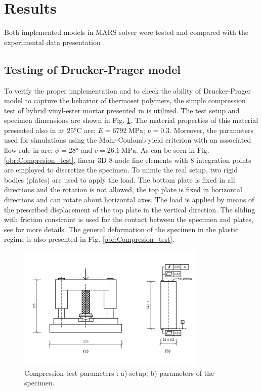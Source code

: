 \thispagestyle{plain}
\section{Results}
\indent

Both implemented models in MARS solver \cite{mars} were tested and compared with the experimental data presentation \cite{heinrich2012generation,Deuch_phd_thesis}. 

\subsection{Testing of Drucker-Prager model}
\indent
 
To verify the proper implementation and to check the ability of Drucker-Prager model to capture the behavior of thermoset polymers, the simple compression test of hybrid vinyl-ester mortar presented in \cite{Deuch_phd_thesis} is utilized. The test setup and specimen dimensions are shown in Fig. \ref{obr:test_param}. The material properties of this material presented also in \cite{Deuch_phd_thesis} at $\ang{25}\mathrm{C} $ are: $E = 6792~\mathrm{MPa}$; $\nu = 0.3$. Moreover, the parameters used for simulations using the Mohr-Coulomb yield criterion with an associated flow-rule in \cite{Deuch_phd_thesis} are: $\phi = \ang{28}$ and $c = 26.1~\mathrm{MPa}$. As can be seen in Fig. \ref{obr:Compresion_test}, linear 3D 8-node fine elements with 8 integration points are employed to discretize the specimen. To mimic the real setup, two rigid bodies (plates) are used to apply the load. The bottom plate is fixed in all directions and the rotation is not allowed, the top plate is fixed in horizontal directions and can rotate about horizontal axes. The load is applied by means of the prescribed displacement of the top plate in the vertical direction. The sliding with friction constraint is used for the contact between the specimen and plates, see \cite{mars} for more details. The general deformation of the specimen in the plastic regime is also presented in Fig. \ref{obr:Compresion_test}. 

\begin{figure}[h!]
	\centering
	\includegraphics[width=0.8\textwidth]{obrazky/test_parameters.png}
	\caption[Compression test parameters]{Compression test parameters \cite{Deuch_phd_thesis}: a) setup; b) parameters of the specimen.}\label{obr:test_param}
\end{figure}

